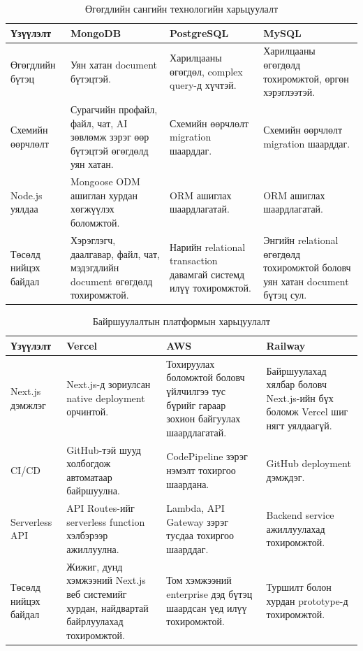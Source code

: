 \begin{table}[H]
\centering
\caption{Өгөгдлийн сангийн технологийн харьцуулалт}
\label{tab:database-tech-comparison}
{\small
\setlength{\tabcolsep}{4pt}
\renewcommand{\arraystretch}{1.25}
\begin{tabular}{|p{2.7cm}|p{3.3cm}|p{3.3cm}|p{3.3cm}|}
\hline
\textbf{Үзүүлэлт} & \textbf{MongoDB} & \textbf{PostgreSQL} & \textbf{MySQL} \\
\hline
Өгөгдлийн бүтэц & Уян хатан document бүтэцтэй. & Харилцааны өгөгдөл, complex query-д хүчтэй. & Харилцааны өгөгдөлд тохиромжтой, өргөн хэрэглээтэй. \\
\hline
Схемийн өөрчлөлт & Сурагчийн профайл, файл, чат, AI зөвлөмж зэрэг өөр бүтэцтэй өгөгдөлд уян хатан. & Схемийн өөрчлөлт migration шаарддаг. & Схемийн өөрчлөлт migration шаарддаг. \\
\hline
Node.js уялдаа & Mongoose ODM ашиглан хурдан хөгжүүлэх боломжтой. & ORM ашиглах шаардлагатай. & ORM ашиглах шаардлагатай. \\
\hline
Төсөлд нийцэх байдал & Хэрэглэгч, даалгавар, файл, чат, мэдэгдлийн document өгөгдөлд тохиромжтой. & Нарийн relational transaction давамгай системд илүү тохиромжтой. & Энгийн relational өгөгдөлд тохиромжтой боловч уян хатан document бүтэц сул. \\
\hline
\end{tabular}
}
\end{table}

\begin{table}[H]
\centering
\caption{Байршуулалтын платформын харьцуулалт}
\label{tab:deployment-tech-comparison}
{\small
\setlength{\tabcolsep}{4pt}
\renewcommand{\arraystretch}{1.25}
\begin{tabular}{|p{2.7cm}|p{3.3cm}|p{3.3cm}|p{3.3cm}|}
\hline
\textbf{Үзүүлэлт} & \textbf{Vercel} & \textbf{AWS} & \textbf{Railway} \\
\hline
Next.js дэмжлэг & Next.js-д зориулсан native deployment орчинтой. & Тохируулах боломжтой боловч үйлчилгээ тус бүрийг гараар зохион байгуулах шаардлагатай. & Байршуулахад хялбар боловч Next.js-ийн бүх боломж Vercel шиг нягт уялдаагүй. \\
\hline
CI/CD & GitHub-тэй шууд холбогдож автоматаар байршуулна. & CodePipeline зэрэг нэмэлт тохиргоо шаардана. & GitHub deployment дэмждэг. \\
\hline
Serverless API & API Routes-ийг serverless function хэлбэрээр ажиллуулна. & Lambda, API Gateway зэрэг тусдаа тохиргоо шаарддаг. & Backend service ажиллуулахад тохиромжтой. \\
\hline
Төсөлд нийцэх байдал & Жижиг, дунд хэмжээний Next.js веб системийг хурдан, найдвартай байрлуулахад тохиромжтой. & Том хэмжээний enterprise дэд бүтэц шаардсан үед илүү тохиромжтой. & Туршилт болон хурдан prototype-д тохиромжтой. \\
\hline
\end{tabular}
}
\end{table}

